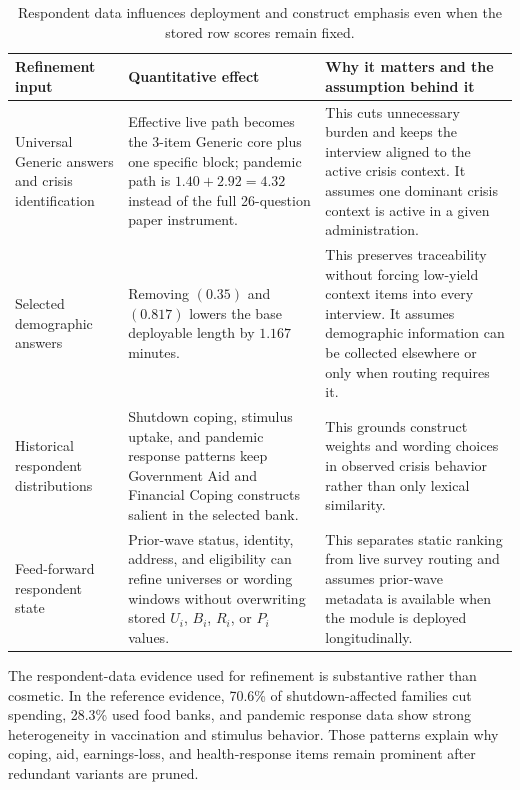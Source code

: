 \documentclass[12pt]{article}
\begin{document}
\begin{table}[H]
\centering
\footnotesize
\begin{tabularx}{\textwidth}{L{0.24\textwidth} Y Y}
\toprule
Refinement input & Quantitative effect & Why it matters and the assumption behind it \\
\midrule
Universal Generic answers and crisis identification & Effective live path becomes the 3-item Generic core plus one specific block; pandemic path is $1.40 + 2.92 = 4.32$ instead of the full 26-question paper instrument. & This cuts unnecessary burden and keeps the interview aligned to the active crisis context. It assumes one dominant crisis context is active in a given administration. \\
Selected demographic answers & Removing  $(0.35)$ and  $(0.817)$ lowers the base deployable length by $1.167$ minutes. & This preserves traceability without forcing low-yield context items into every interview. It assumes demographic information can be collected elsewhere or only when routing requires it. \\
Historical respondent distributions & Shutdown coping, stimulus uptake, and pandemic response patterns keep Government Aid and Financial Coping constructs salient in the selected bank. & This grounds construct weights and wording choices in observed crisis behavior rather than only lexical similarity. \\
Feed-forward respondent state & Prior-wave status, identity, address, and eligibility can refine universes or wording windows without overwriting stored $U_i$, $B_i$, $R_i$, or $P_i$ values. & This separates static ranking from live survey routing and assumes prior-wave metadata is available when the module is deployed longitudinally. \\
\bottomrule
\end{tabularx}
\caption{Respondent data influences deployment and construct emphasis even when the stored row scores remain fixed.}
\end{table}

The respondent-data evidence used for refinement is substantive rather than cosmetic. In the reference evidence, 70.6\% of shutdown-affected families cut spending, 28.3\% used food banks, and pandemic response data show strong heterogeneity in vaccination and stimulus behavior. Those patterns explain why coping, aid, earnings-loss, and health-response items remain prominent after redundant variants are pruned.
\end{document}
